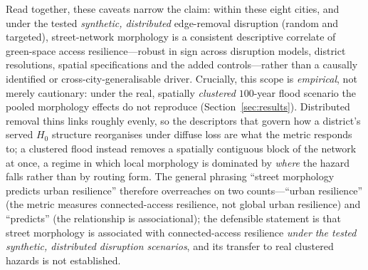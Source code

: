 Read together, these caveats narrow the claim: within these eight cities, and under
the tested \emph{synthetic, distributed} edge-removal disruption (random and targeted),
street-network morphology is a consistent descriptive correlate of green-space access
resilience---robust in sign across disruption models, district resolutions, spatial
specifications and the added controls---rather than a causally identified or
cross-city-generalisable driver. Crucially, this scope is \emph{empirical}, not merely
cautionary: under the real, spatially \emph{clustered} $100$-year flood scenario the
pooled morphology effects do not reproduce (Section~\ref{sec:results}). Distributed
removal thins links roughly evenly, so the descriptors that govern how a district's
served $H_0$ structure reorganises under diffuse loss are what the metric
responds to; a clustered flood instead removes a spatially contiguous block of the
network at once, a regime in which local morphology is dominated by \emph{where} the
hazard falls rather than by routing form. The general phrasing ``street morphology
predicts urban resilience'' therefore overreaches on two counts---``urban resilience''
(the metric measures connected-access resilience, not global urban resilience) and
``predicts'' (the relationship is associational); the defensible statement is that
street morphology is associated with connected-access resilience \emph{under the
tested synthetic, distributed disruption scenarios}, and its transfer to real
clustered hazards is not established.


